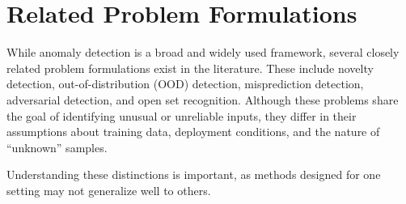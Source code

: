 \documentclass{article}
\begin{document}
    
    


\section{Related Problem Formulations}

While anomaly detection is a broad and widely used framework, several closely related problem formulations exist in the literature. These include novelty detection, out-of-distribution (OOD) detection, misprediction detection, adversarial detection, and open set recognition. Although these problems share the goal of identifying unusual or unreliable inputs, they differ in their assumptions about training data, deployment conditions, and the nature of “unknown” samples.

Understanding these distinctions is important, as methods designed for one setting may not generalize well to others.
\end{document}

